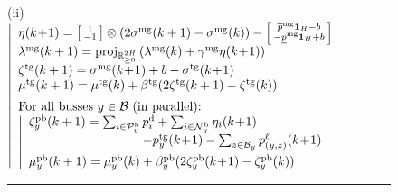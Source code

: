 \documentclass{IEEEtran}  %
\newcommand{\mc}{\mathcal}
\newcommand{\bb}{\mathbb}
\newcommand{\R}{\bb R}
\newcommand{\proj}{\mathrm{proj}}
\newcommand{\0}{\mathbf{0}}
\newcommand{\1}{\mathbf{1}}
\begin{document}
\begin{figure}[t]
{\begin{minipage}{\columnwidth}
\medskip
\noindent
\noindent 
(ii) \\[.2em]
\hspace*{.15em}
$
\left| 
\begin{array}{l}
%
\eta(k\!+\!1) = 
	\left[
	\begin{smallmatrix}
	1\\
	- 1 
	\end{smallmatrix}
	\right] \otimes (2 \sigma^{\text{mg}}(k+1)- \sigma^{\text{mg}}(k)) 
	-
	\left[
	\begin{smallmatrix}
	\overline{p}^{\mathrm{mg}}\1_{H}-b \\
	-     \underline{p}^{\mathrm{mg}} \1_{H}+b
	\end{smallmatrix} 
	\right]\\
	\lambda^{\text{mg}}(k+1) = \textstyle
	\proj_{\R^{2 H}_{\geq 0}}\left( 
	\lambda^{\text{mg}}(k) + \gamma^{\text{mg}} \eta(k\!+\!1)
	 \right)\\
%
\zeta^{\text{tg}}(k+1) = \sigma^{\text{mg}}
	(k\!+\!1)+b- \sigma^{\text{tg}}(k\!+\!1)\\
	\mu^{\text{tg}}(k+1) = \mu^{\text{tg}}(k) + \beta^{\text{tg}} (2\zeta^{\text{tg}}(k+1)-\zeta^{\text{tg}}(k))\\[.5em]
\text{For all busses } y \in \mc B \text{ (in parallel):}\\
\left|
\begin{array}{l}
\zeta^{\text{pb}}_y(k+1)   = \sum_{i \in \mc P_y^{\mathrm{b}}} p_i^{\mathrm{d}} + \sum_{i \in \mc N_y^{\mathrm{b}}} \eta_i(k\!+\!1)\\
\hspace*{9em} - p^{\text{tg}}_y(k\!+\!1) - \sum_{z \in \mc B_y} p^\ell_{(y,z)} (k\!+\!1)\\[.5em]
%
\mu_y^{\text{pb}}(k+1) = \mu_y^{\text{pb}}(k) + \beta^{\text{pb}}_y (2 \zeta^{\text{pb}}_y(k\!+\!1)- \zeta^{\text{pb}}_y(k))
\end{array}
\right.
\end{array}
\right.
$

\medskip
\hrule
\end{minipage}
}
\end{figure}
\end{document}
